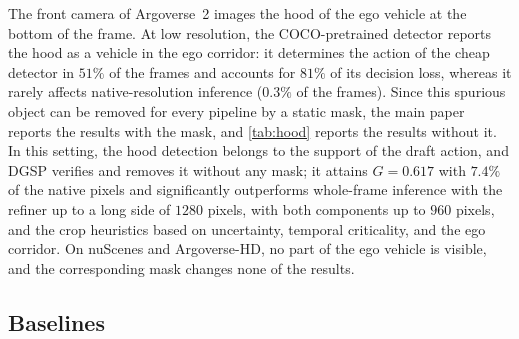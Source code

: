 \documentclass[10pt,letterpaper]{article}
\newcommand{\method}{DGSP\xspace}
\newcommand{\G}{G}
\theoremstyle{remark}
\theoremstyle{plain}
\theoremstyle{definition}
\begin{document}
The front camera of Argoverse~2 images the hood of the ego vehicle at the bottom of the frame.
At low resolution, the COCO-pretrained detector reports the hood as a vehicle in the ego corridor: it determines the action of the cheap detector in $51\%$ of the frames and accounts for $81\%$ of its decision loss, whereas it rarely affects native-resolution inference ($0.3\%$ of the frames).
Since this spurious object can be removed for every pipeline by a static mask, the main paper reports the results with the mask, and \cref{tab:hood} reports the results without it.
In this setting, the hood detection belongs to the support of the draft action, and \method verifies and removes it without any mask; it attains $\G=0.617$ with $7.4\%$ of the native pixels and significantly outperforms whole-frame inference with the refiner up to a long side of $1280$ pixels, with both components up to $960$ pixels, and the crop heuristics based on uncertainty, temporal criticality, and the ego corridor.
On nuScenes and Argoverse-HD, no part of the ego vehicle is visible, and the corresponding mask changes none of the results.

\subsection{Baselines}
\label{sec:supp_baselines}
\end{document}
